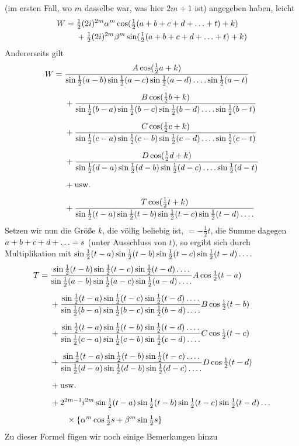 (im ersten Fall, wo $m$ dasselbe war, was hier $2m+1$ ist) angegeben haben, leicht
\[
\begin{aligned}
W={}&\tfrac12(2i)^{2m}\alpha^m\cos(\tfrac12(a+b+c+d+\mathinner{.\,.\,.}+t)+k)\\
&+\tfrac12(2i)^{2m}\beta^m\sin(\tfrac12(a+b+c+d+\mathinner{.\,.\,.}+t)+k)
\end{aligned}
\]
Andererseits gilt
\endgroup
\begingroup
\renewcommand{\arraystretch}{1.45}
\[
\begin{aligned}
W={}&\frac{A\cos(\tfrac12a+k)}{\sin\tfrac12(a-b)\sin\tfrac12(a-c)\sin\tfrac12(a-d)\mathinner{.\,.\,.\,.}\sin\tfrac12(a-t)}\\[5pt]
&+\frac{B\cos(\tfrac12b+k)}{\sin\tfrac12(b-a)\sin\tfrac12(b-c)\sin\tfrac12(b-d)\mathinner{.\,.\,.\,.}\sin\tfrac12(b-t)}\\[5pt]
&+\frac{C\cos(\tfrac12c+k)}{\sin\tfrac12(c-a)\sin\tfrac12(c-b)\sin\tfrac12(c-d)\mathinner{.\,.\,.\,.}\sin\tfrac12(c-t)}\\[5pt]
&+\frac{D\cos(\tfrac12d+k)}{\sin\tfrac12(d-a)\sin\tfrac12(d-b)\sin\tfrac12(d-c)\mathinner{.\,.\,.\,.}\sin\tfrac12(d-t)}\\[5pt]
&+\text{usw.}\\[5pt]
&+\frac{T\cos(\tfrac12t+k)}{\sin\tfrac12(t-a)\sin\tfrac12(t-b)\sin\tfrac12(t-c)\sin\tfrac12(t-d)\mathinner{.\,.\,.\,.}}
\end{aligned}
\]
Setzen wir nun die Größe $k$, die völlig beliebig ist, $=-\tfrac12t$,
die Summe dagegen $a+b+c+d+\mathinner{.\,.\,.}=s$ (unter Ausschluss von $t$), so ergibt sich durch Multiplikation mit
$\sin\tfrac12(t-a)\sin\tfrac12(t-b)\sin\tfrac12(t-c)\sin\tfrac12(t-d)\mathinner{.\,.\,.\,.}$
\[
\begin{aligned}
T={}&\frac{\sin\tfrac12(t-b)\sin\tfrac12(t-c)\sin\tfrac12(t-d)\mathinner{.\,.\,.\,.}}{\sin\tfrac12(a-b)\sin\tfrac12(a-c)\sin\tfrac12(a-d)\mathinner{.\,.\,.\,.}}A\cos\tfrac12(t-a)\\[5pt]
&+\frac{\sin\tfrac12(t-a)\sin\tfrac12(t-c)\sin\tfrac12(t-d)\mathinner{.\,.\,.\,.}}{\sin\tfrac12(b-a)\sin\tfrac12(b-c)\sin\tfrac12(b-d)\mathinner{.\,.\,.\,.}}B\cos\tfrac12(t-b)\\[5pt]
&+\frac{\sin\tfrac12(t-a)\sin\tfrac12(t-b)\sin\tfrac12(t-d)\mathinner{.\,.\,.\,.}}{\sin\tfrac12(c-a)\sin\tfrac12(c-b)\sin\tfrac12(c-d)\mathinner{.\,.\,.\,.}}C\cos\tfrac12(t-c)\\[5pt]
&+\frac{\sin\tfrac12(t-a)\sin\tfrac12(t-b)\sin\tfrac12(t-c)\mathinner{.\,.\,.\,.}}{\sin\tfrac12(d-a)\sin\tfrac12(d-b)\sin\tfrac12(d-c)\mathinner{.\,.\,.\,.}}D\cos\tfrac12(t-d)\\[5pt]
&+\text{usw.}\\[5pt]
&+2^{2m-1}i^{2m}\sin\tfrac12(t-a)\sin\tfrac12(t-b)\sin\tfrac12(t-c)\sin\tfrac12(t-d)\mathinner{.\,.\,.}\\[5pt]
&\qquad\times\{\alpha^m\cos\tfrac12s+\beta^m\sin\tfrac12s\}
\end{aligned}
\]
Zu dieser Formel fügen wir noch einige Bemerkungen hinzu

